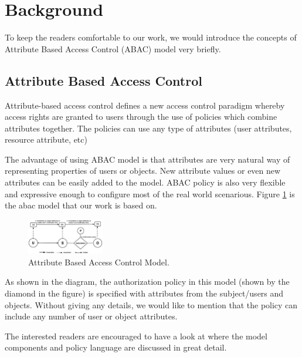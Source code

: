 \section{Background}

To keep the readers comfortable to our work, we would introduce  the concepts of Attribute Based Access Control (ABAC) model very briefly.

\subsection{Attribute Based Access Control}

Attribute-based access control defines a new access control paradigm whereby access rights are granted to users through the use of policies which combine attributes together. The policies can use any type of attributes (user attributes, resource attribute, etc) \cite{abacwiki}

The advantage of using ABAC model is that attributes are  very natural way of representing properties of users or objects. New attribute values or even new attributes can be easily added to the model.  ABAC policy is also very flexible and expressive enough to configure most of the real world scenarious. Figure \ref{fig:abac} is the abac model  that our work is based on. 

\begin{figure}[h!] 
  \centering
    \includegraphics[width=0.3\textwidth]{eps/abac_model}
 \caption{Attribute Based Access Control Model.}
 \label{fig:abac}
\end{figure}

As shown in the diagram,   the authorization policy in this model (shown by the diamond in the figure) is specified with attributes from the subject/users and objects. Without giving any details, we would like to mention that the policy can include any number of user or object attributes.

The interested readers are encouraged to have a look at \cite{abac} where the model components and policy language are discussed in great detail. 

